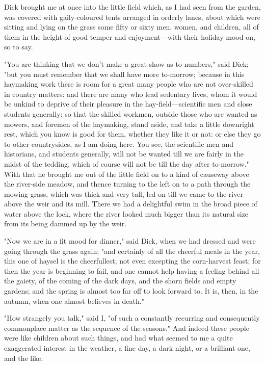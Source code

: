 Dick brought me at once into the little field which, as I had seen from
the garden, was covered with gaily-coloured tents arranged in orderly
lanes, about which were sitting and lying on the grass some fifty or
sixty men, women, and children, all of them in the height of good temper
and enjoyment---with their holiday mood on, so to say.

"You are thinking that we don't make a great show as to numbers," said
Dick; "but you must remember that we shall have more to-morrow; because
in this haymaking work there is room for a great many people who are not
over-skilled in country matters: and there are many who lead sedentary
lives, whom it would be unkind to deprive of their pleasure in the
hay-field---scientific men and close students generally: so that the
skilled workmen, outside those who are wanted as mowers, and foremen of
the haymaking, stand aside, and take a little downright rest, which you
know is good for them, whether they like it or not: or else they go to
other countrysides, as I am doing here. You see, the scientific men and
historians, and students generally, will not be wanted till we are
fairly in the midst of the tedding, which of course will not be till the
day after to-morrow." With that he brought me out of the little field on
to a kind of causeway above the river-side meadow, and thence turning to
the left on to a path through the mowing grass, which was thick and very
tall, led on till we came to the river above the weir and its mill.
There we had a delightful swim in the broad piece of water above the
lock, where the river looked much bigger than its natural size from its
being dammed up by the weir.

"Now we are in a fit mood for dinner," said Dick, when we had dressed
and were going through the grass again; "and certainly of all the
cheerful meals in the year, this one of haysel is the cheerfullest; not
even excepting the corn-harvest feast; for then the year is beginning to
fail, and one cannot help having a feeling behind all the gaiety, of the
coming of the dark days, and the shorn fields and empty gardens; and the
spring is almost too far off to look forward to. It is, then, in the
autumn, when one almost believes in death."

"How strangely you talk," said I, "of such a constantly recurring and
consequently commonplace matter as the sequence of the seasons." And
indeed these people were like children about such things, and had what
seemed to me a quite exaggerated interest in the weather, a fine day, a
dark night, or a brilliant one, and the like.

